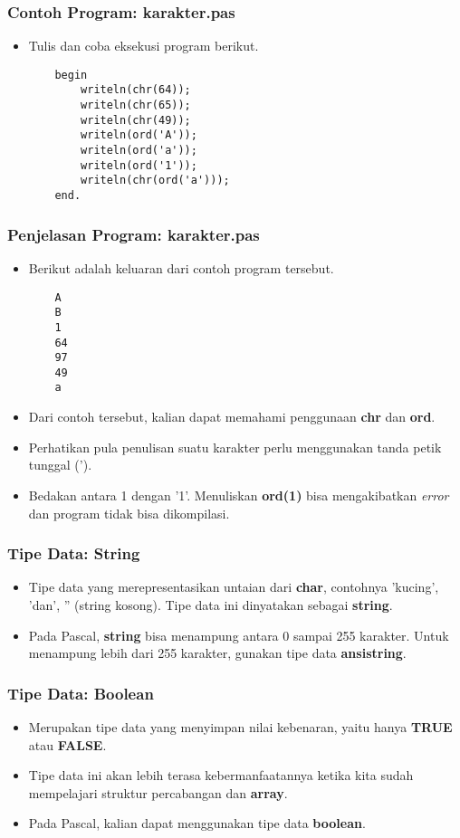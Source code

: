 \documentclass{beamer}
\begin{document}
\begin{frame}[fragile]
\frametitle{Contoh Program: karakter.pas}
\begin{itemize}
    \item Tulis dan coba eksekusi program berikut.
    \begin{lstlisting}
    begin
        writeln(chr(64));
        writeln(chr(65));
        writeln(chr(49));
        writeln(ord('A'));
        writeln(ord('a'));
        writeln(ord('1'));
        writeln(chr(ord('a')));
    end.
    \end{lstlisting}
\end{itemize}
\end{frame}

\begin{frame}[fragile]
\frametitle{Penjelasan Program: karakter.pas}
\begin{itemize}
    \item Berikut adalah keluaran dari contoh program tersebut.
    \begin{lstlisting}
    A
    B
    1
    64
    97
    49
    a
    \end{lstlisting}
    \item Dari contoh tersebut, kalian dapat memahami penggunaan \textbf{chr} dan \textbf{ord}.
    \item Perhatikan pula penulisan suatu karakter perlu menggunakan tanda petik tunggal (').
    \item Bedakan antara 1 dengan '1'. Menuliskan \textbf{ord(1)} bisa mengakibatkan \textit{error} dan program tidak bisa dikompilasi.
\end{itemize}
\end{frame}

\begin{frame}
\frametitle{Tipe Data: String}
\begin{itemize}
    \item Tipe data yang merepresentasikan untaian dari \textbf{char}, contohnya 'kucing', 'dan', '' (string kosong). Tipe data ini dinyatakan sebagai \alert{\textbf{string}}.
    \item Pada Pascal, \textbf{string} bisa menampung antara 0 sampai 255 karakter. Untuk menampung lebih dari 255 karakter, gunakan tipe data \alert{\textbf{ansistring}}.
\end{itemize}
\end{frame}

\begin{frame}
\frametitle{Tipe Data: Boolean}
\begin{itemize}
    \item Merupakan tipe data yang menyimpan nilai kebenaran, yaitu hanya \textbf{TRUE} atau \textbf{FALSE}.
    \item Tipe data ini akan lebih terasa kebermanfaatannya ketika kita sudah mempelajari struktur percabangan dan \textbf{array}.
    \item Pada Pascal, kalian dapat menggunakan tipe data \alert{\textbf{boolean}}.
\end{itemize}
\end{frame}
\end{document}
